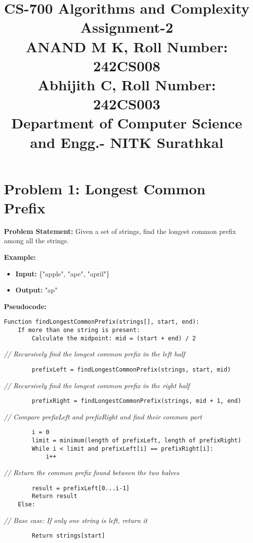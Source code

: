 \documentclass[a4paper,12pt]{report}
\title{
  \vspace{-2em} %
  \textbf{CS-700 Algorithms and Complexity} \\ %
  \large \textbf{Assignment-2} \\ %
  \vspace{1em} %
  \textbf{ANAND M K, Roll Number: 242CS008} \\ %
  \textbf{Abhijith C, Roll Number: 242CS003 } \\ %

  Department of Computer Science and Engg.- NITK Surathkal
}
\author{} %
\date{} %
\begin{document}
\maketitle

\section*{Problem 1: Longest Common Prefix}

\large \textbf{Problem Statement:}  
Given a set of strings, find the longest common prefix among all the strings.  

\textbf{Example:}
\begin{itemize}
    \item \textbf{Input:} \{"apple", "ape", "april"\}
    \item \textbf{Output:} "ap"
\end{itemize}

\textbf{Pseudocode:}

\begin{tcolorbox}[colback=white, colframe=black, boxrule=0.5pt] %
\ttfamily\small  %
\begin{verbatim}
Function findLongestCommonPrefix(strings[], start, end):
    If more than one string is present:
        Calculate the midpoint: mid = (start + end) / 2
\end{verbatim}
\textit{\color{gray} // Recursively find the longest common prefix in the left half}
\begin{verbatim}
        prefixLeft = findLongestCommonPrefix(strings, start, mid)
\end{verbatim}
\textit{\color{gray} // Recursively find the longest common prefix in the right half}
\begin{verbatim}
        prefixRight = findLongestCommonPrefix(strings, mid + 1, end)
\end{verbatim}
\textit{\color{gray} // Compare prefixLeft and prefixRight and find their common part}
\begin{verbatim}
        i = 0
        limit = minimum(length of prefixLeft, length of prefixRight)
        While i < limit and prefixLeft[i] == prefixRight[i]:
            i++
\end{verbatim}
\textit{\color{gray} // Return the common prefix found between the two halves}
\begin{verbatim}
        result = prefixLeft[0...i-1]
        Return result
    Else:
\end{verbatim}
\textit{\color{gray} // Base case: If only one string is left, return it}
\begin{verbatim}
        Return strings[start]
\end{verbatim}
\end{tcolorbox}
\end{document}
